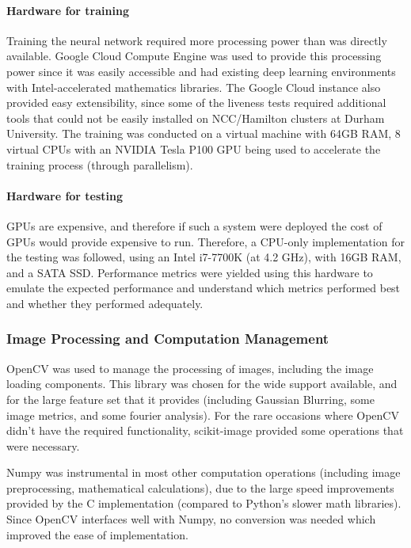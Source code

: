 \documentclass[12pt,a4paper]{article}
\begin{document}
            \paragraph{Hardware for training}
            Training the neural network required more processing power than was directly available. Google Cloud Compute Engine was used to provide this processing power since it was easily accessible and had existing deep learning environments with Intel-accelerated mathematics libraries. 
            The Google Cloud instance also provided easy extensibility, since some of the liveness tests required additional tools that could not be easily installed on NCC/Hamilton clusters at Durham University. The training was conducted on a virtual machine with 64GB RAM, 8 virtual CPUs
            with an NVIDIA Tesla P100 GPU being used to accelerate the training process (through parallelism).

            \paragraph{Hardware for testing}
            GPUs are expensive, and therefore if such a system were deployed the cost of GPUs would provide expensive to run. Therefore, a CPU-only implementation for the testing was followed, using an Intel i7-7700K (at 4.2 GHz), with 16GB RAM, and a SATA SSD. Performance metrics were yielded using this hardware to emulate the expected performance and understand which metrics performed best and whether they performed adequately.

        \subsubsection{Image Processing and Computation Management}
            OpenCV was used to manage the processing of images, including the image loading components. This library was chosen for the wide support available, and for the large feature set that it provides (including Gaussian Blurring, some image metrics, and some fourier analysis).
            For the rare occasions where OpenCV didn't have the required functionality, scikit-image provided some operations that were necessary.
            
            Numpy was instrumental in most other computation operations (including image preprocessing, mathematical calculations), due to the large speed improvements provided by the C implementation (compared to Python's slower math libraries).
            Since OpenCV interfaces well with Numpy, no conversion was needed which improved the ease of implementation.
\end{document}
